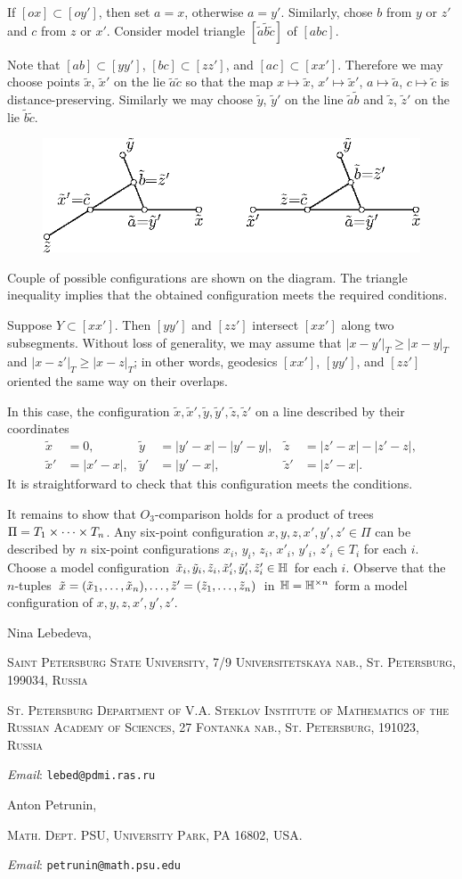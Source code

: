 \documentclass{article}
\makeatletter
\newcommand{\Addresses}{{\bigskip\footnotesize

\noindent Nina Lebedeva,
\par\nopagebreak
 \textsc{Saint Petersburg State University, 7/9 Universitetskaya nab., St. Petersburg, 199034, Russia}
\par
\nopagebreak
 \textsc{St. Petersburg Department of V.A. Steklov Institute of Mathematics of the Russian Academy of Sciences, 27 Fontanka nab., St. Petersburg, 191023, Russia}
  \par\nopagebreak
  \textit{Email}: \texttt{lebed@pdmi.ras.ru}

\medskip

\noindent   Anton Petrunin, 
\par\nopagebreak
 \textsc{Math. Dept. PSU, University Park, PA 16802, USA.}
  \par\nopagebreak
  \textit{Email}: \texttt{petrunin@math.psu.edu}
  
}}
\makeatother
\begin{document}
If $[ox]\subset [oy']$, then set $a=x$, otherwise $a=y'$.
Similarly, chose  $b$ from $y$ or $z'$ and $c$ from $z$ or $x'$.
Consider model triangle $[\tilde a\tilde b\tilde c]$ of $[abc]$.

Note that $[ab]\subset [yy']$, $[bc]\subset [zz']$, and $[ac]\subset [xx']$.
Therefore we may choose points $\tilde x$, $\tilde x'$ on the lie $\tilde a\tilde c$ so that the map $x\mapsto \tilde x$, $x'\mapsto \tilde x'$, $a\mapsto \tilde a$, $c\mapsto \tilde c$ is distance-preserving.
Similarly we may choose $\tilde y$, $\tilde y'$ on the line $\tilde a\tilde b$ and $\tilde z$, $\tilde z'$ on the lie $\tilde b\tilde c$.
\begin{figure}[ht!]
\centering
\includegraphics{mppics/pic-50}
\end{figure}
Couple of possible configurations are shown on the diagram.
The triangle inequality implies that the obtained configuration meets the required conditions.

Suppose $Y\subset [xx']$.
Then $[yy']$ and $[zz']$ intersect $[xx']$ along two subsegments.
Without loss of generality, we may assume that $|x-y'|_T\ge |x-y|_T$ and $|x-z'|_T\ge |x-z|_T$;
in other words, geodesics $[xx']$, $[yy']$, and $[zz']$ oriented the same way on their overlaps.

In this case, the configuration $\tilde x,\tilde x',\tilde y,\tilde y',\tilde z,\tilde z'$ on a line described by their coordinates
\begin{align*}
\tilde x&=0,
&
\tilde y&=|y'-x|-|y'-y|,
&
\tilde z&=|z'-x|-|z'-z|,
\\
\tilde x'&=|x'-x|,
&
\tilde y'&=|y'-x|,
&
\tilde z'&=|z'-x|.
\end{align*}
It is straightforward to check that this configuration meets the conditions. 

It remains to show that $O_3$-comparison holds for a product of trees $\Pi\z=T_1\times \dots\times T_n$.
Any six-point configuration $x,y,z,x',y',z'\in \Pi$ can be described by $n$ six-point configurations $x_i$, $y_i$, $z_i$, $x'_i$, $y'_i$, $z'_i\in T_i$ for each $i$.
Choose a model configuration $\tilde x_i,\tilde y_i,\tilde z_i,\tilde x'_i,\tilde y'_i,\tilde z'_i\in \mathbb H$ for each $i$.
Observe that the $n$-tuples $\tilde x=(\tilde x_1,\dots, \tilde x_n),\z\dots,\tilde z'=(\tilde z_1,\dots, \tilde z_n)$ in $\mathbb H=\mathbb H^{\times n}$ form a model configuration of $x,y,z,x',y',z'$.
\qeds



{\sloppy
\printbibliography[heading=bibintoc]
\fussy
}

\Addresses
\end{document}

